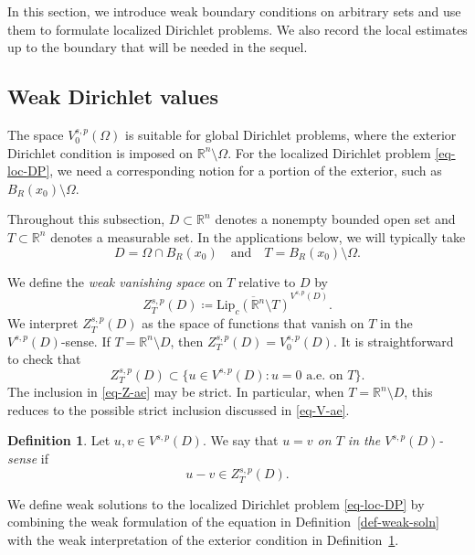 \documentclass[11pt]{amsart}
\theoremstyle{plain}
\theoremstyle{definition}
\newtheorem{definition}[theorem]{Definition}
\numberwithin{equation}{section}
\begin{document}
In this section, we introduce weak boundary conditions on arbitrary sets and use them to formulate localized Dirichlet problems. We also record the local estimates up to the boundary that will be needed in the sequel.

\subsection{Weak Dirichlet values}

The space $V^{s, p}_0(\Omega)$ is suitable for global Dirichlet problems, where the exterior Dirichlet condition is imposed on $\mathbb{R}^n \setminus \Omega$. For the localized Dirichlet problem \eqref{eq-loc-DP}, we need a corresponding notion for a portion of the exterior, such as $B_R(x_0) \setminus \Omega$.

Throughout this subsection, $D \subset \mathbb{R}^n$ denotes a nonempty bounded open set and $T \subset \mathbb{R}^n$ denotes a measurable set. In the applications below, we will typically take
\begin{equation}\label{eq-DT}
D = \Omega \cap B_R(x_0) \quad\text{and}\quad T = B_R(x_0) \setminus \Omega.
\end{equation}

We define the \emph{weak vanishing space} on $T$ relative to $D$ by
\begin{equation*}
Z^{s, p}_T(D) \coloneqq \overline{\mathrm{Lip}_c(\mathbb{R}^n \setminus T)}^{V^{s, p}(D)}.
\end{equation*}
We interpret $Z^{s, p}_T(D)$ as the space of functions that vanish on $T$ in the $V^{s,p}(D)$-sense. If $T=\mathbb{R}^n \setminus D$, then $Z^{s, p}_T(D) = V^{s, p}_0(D)$. It is straightforward to check that
\begin{equation}\label{eq-Z-ae}
Z^{s, p}_T(D) \subset \{u \in V^{s, p}(D): u=0 \text{ a.e.\ on }T\}.
\end{equation}
The inclusion in \eqref{eq-Z-ae} may be strict. In particular, when $T=\mathbb R^n\setminus D$, this reduces to the possible strict inclusion discussed in \eqref{eq-V-ae}.

\begin{definition}\label{def-weak-bdry}
Let $u, v \in V^{s, p}(D)$. We say that \emph{$u=v$ on $T$ in the $V^{s, p}(D)$-sense} if
\begin{equation*}
u-v \in Z^{s, p}_T(D).
\end{equation*}
\end{definition}

We define weak solutions to the localized Dirichlet problem \eqref{eq-loc-DP} by combining the weak formulation of the equation in Definition~\ref{def-weak-soln} with the weak interpretation of the exterior condition in Definition~\ref{def-weak-bdry}.
\end{document}
